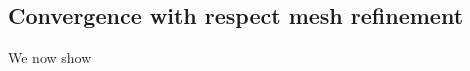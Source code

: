 \documentclass[11pt]{article}
\newcommand{\bx}{\mathbf{x}}
\begin{document}
\subsection{Convergence with respect mesh refinement}

We now show 





\end{document}
